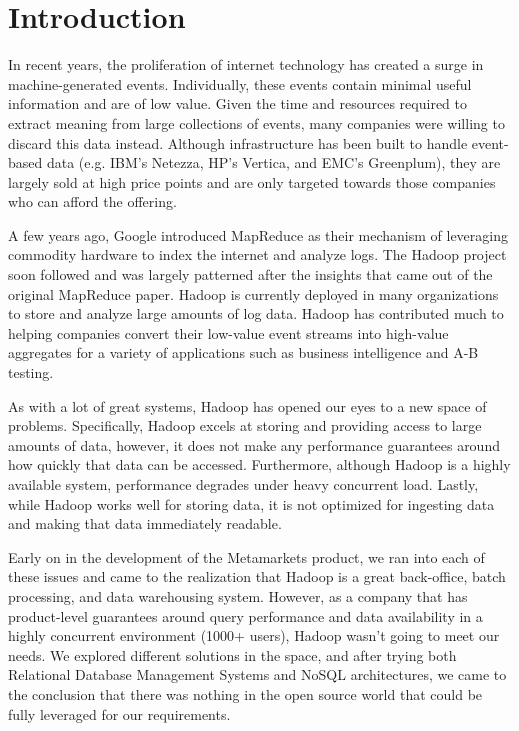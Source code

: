 \documentclass{sig-alternate-2013}
\begin{document}
\section{Introduction} 
In recent years, the proliferation of internet technology has
created a surge in machine-generated events.  Individually, these
events contain minimal useful information and are of low value.  Given the
time and resources required to extract meaning from large collections of
events, many companies were willing to discard this data instead.  Although
infrastructure has been built to handle event-based data (e.g. IBM's
Netezza\cite{singh2011introduction}, HP's Vertica\cite{bear2012vertica}, and EMC's
Greenplum\cite{miner2012unified}), they are largely sold at high price points
and are only targeted towards those companies who can afford the offering.

A few years ago, Google introduced MapReduce \cite{dean2008mapreduce} as their
mechanism of leveraging commodity hardware to index the internet and analyze
logs.  The Hadoop \cite{shvachko2010hadoop} project soon followed and was
largely patterned after the insights that came out of the original MapReduce
paper. Hadoop is currently deployed in many organizations to store and analyze
large amounts of log data.  Hadoop has contributed much to helping companies
convert their low-value event streams into high-value aggregates for a variety
of applications such as business intelligence and A-B testing.

As with a lot of great systems, Hadoop has opened our eyes to a new space of
problems.  Specifically, Hadoop excels at storing and providing access to large
amounts of data, however, it does not make any performance guarantees around
how quickly that data can be accessed.  Furthermore, although Hadoop is a
highly available system, performance degrades under heavy concurrent load.
Lastly, while Hadoop works well for storing data, it is not optimized for
ingesting data and making that data immediately readable.

Early on in the development of the Metamarkets product, we ran into each of
these issues and came to the realization that Hadoop is a great back-office,
batch processing, and data warehousing system.  However, as a company that has
product-level guarantees around query performance and data availability in a
highly concurrent environment (1000+ users), Hadoop wasn't going to meet our
needs.  We explored different solutions in the space, and after
trying both Relational Database Management Systems and NoSQL architectures, we
came to the conclusion that there was nothing in the open source world that
could be fully leveraged for our requirements.
\end{document}
